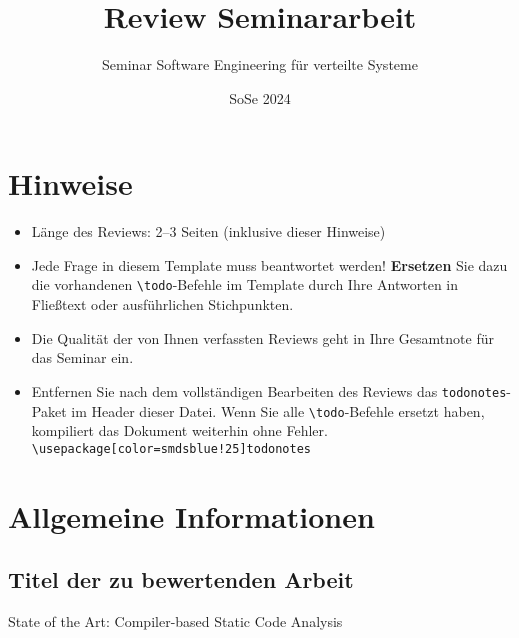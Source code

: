 \documentclass[a4paper,DIV=16]{scrartcl}
\begin{document}
\title{Review Seminararbeit}
\date{SoSe 2024}

\subtitle{Seminar Software Engineering für verteilte Systeme}

\author{}

\maketitle
\thispagestyle{empty}

\section*{Hinweise}
\begin{itemize}
\item Länge des Reviews: 2--3 Seiten (inklusive dieser Hinweise)
\item Jede Frage in diesem Template muss beantwortet werden! \textbf{Ersetzen}
Sie dazu die vorhandenen \texttt{\textbackslash{}todo}-Befehle im Template durch
Ihre Antworten in Fließtext oder ausführlichen Stichpunkten.
\item Die Qualität der von Ihnen verfassten Reviews geht in Ihre Gesamtnote für
das Seminar ein.
\item Entfernen Sie nach dem vollständigen Bearbeiten des Reviews das
\texttt{todonotes}-Paket im Header dieser Datei. Wenn Sie alle
\texttt{\textbackslash{}todo}-Befehle ersetzt haben, kompiliert das Dokument
weiterhin ohne Fehler.
\texttt{\textbackslash{}usepackage[color=smdsblue!25]{todonotes}}
\end{itemize}

\section*{Allgemeine Informationen}
\subsection*{Titel der zu bewertenden Arbeit}

State of the Art: Compiler-based Static Code Analysis
\end{document}
